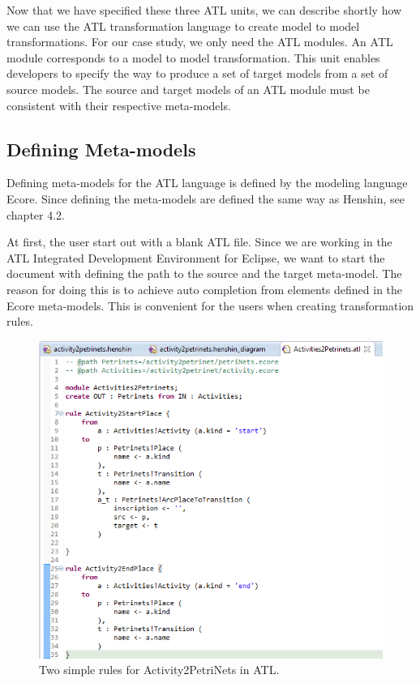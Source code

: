Now that we have specified these three ATL units, we can describe shortly how
we can use the ATL transformation language to create model to model
transformations. For our case study, we only need the ATL modules. An ATL module
corresponds to a model to model transformation. This unit enables developers to
specify the way to produce a set of target models from a set of source models.
The source and target models of an ATL module must be consistent with their
respective meta-models. 

\subsection{Defining Meta-models}

Defining meta-models for the ATL language is defined by the modeling language
Ecore. Since defining the meta-models are defined the same way as Henshin, see
chapter 4.2.

At first, the user start out with a blank ATL file. Since we are working in
the ATL Integrated Development Environment for Eclipse, we want to start the
document with defining the path to the source and the target meta-model. The
reason for doing this is to achieve auto completion from elements defined in the
Ecore meta-models. This is convenient for the users when creating transformation
rules.  

\begin{figure}[H]
	\centering
	\includegraphics[scale=0.5]{figures/ATLScreen.png}
	\caption[Simple rules for ATL]
	{Two simple rules for Activity2PetriNets in ATL.}
	\label{fig:ATL_Screen}
\end{figure}

